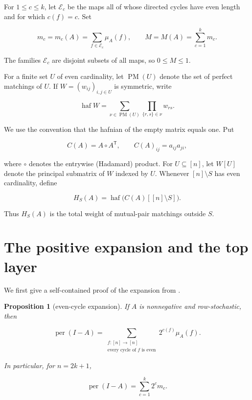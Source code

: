 \documentclass[11pt]{article}
\newtheorem{proposition}[theorem]{Proposition}
\theoremstyle{remark}
\begin{document}
For $1\le c\le k$, let $\mathcal E_c$ be the maps all of whose directed
cycles have even length and for which $c(f)=c$. Set

\[
m_c=m_c(A)=\sum_{f\in\mathcal E_c}\mu_A(f),
\qquad
M=M(A)=\sum_{c=1}^k m_c.
\tag{2.3}
\]

The families $\mathcal E_c$ are disjoint subsets of all maps, so $0\le M\le1$.

For a finite set $U$ of even cardinality, let $\operatorname{PM}(U)$ denote
the set of perfect matchings of $U$. If
$W=(w_{ij})_{i,j\in U}$ is symmetric, write

\[
\operatorname{haf}W
=\sum_{\nu\in\operatorname{PM}(U)}
\prod_{\{r,s\}\in\nu}w_{rs}.
\tag{2.4}
\]

We use the convention that the hafnian of the empty matrix equals one. Put

\[
C(A)=A\circ A^{\mathsf T},
\qquad C(A)_{ij}=a_{ij}a_{ji},
\tag{2.5}
\]

where $\circ$ denotes the entrywise (Hadamard) product. For
$U\subseteq[n]$, let $W[U]$ denote the principal submatrix of $W$ indexed by
$U$. Whenever $[n]\setminus S$ has even cardinality, define

\[
H_S(A)=\operatorname{haf}\bigl(C(A)[[n]\setminus S]\bigr).
\tag{2.6}
\]

Thus $H_S(A)$ is the total weight of mutual-pair matchings outside $S$.

\section{The positive expansion and the top layer}

We first give a self-contained proof of the expansion from \cite{kimroush1981}.

\begin{proposition}[even-cycle expansion]
If $A$ is nonnegative and
row-stochastic, then

\[
\operatorname{per}(I-A)=
\sum_{\substack{f:[n]\to[n]\\
\text{every cycle of }f\text{ is even}}}
2^{c(f)}\mu_A(f).
\tag{3.1}
\]

In particular, for $n=2k+1$,

\[
\operatorname{per}(I-A)=\sum_{c=1}^k2^c m_c.
\tag{3.2}
\]

\end{proposition}
\end{document}
